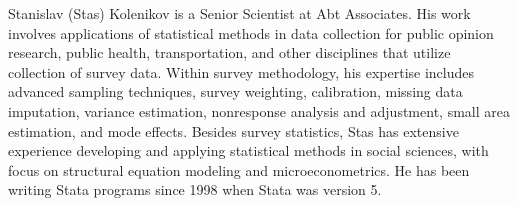\begin{aboutauthor}
  Stanislav (Stas) Kolenikov is a Senior Scientist at Abt Associates.
  His work involves applications of statistical methods in data collection
  for public opinion research, public health, transportation, and other disciplines
  that utilize collection of survey data.
  Within survey methodology, his expertise includes advanced sampling techniques,
  survey weighting, calibration, missing data imputation, variance estimation,
  nonresponse analysis and adjustment, small area estimation, and mode effects.
  Besides survey statistics, Stas has extensive experience developing and applying
  statistical methods in social sciences, with focus on structural equation
  modeling and microeconometrics. He has been writing Stata programs since
  1998 when Stata was version 5.
\end{aboutauthor}
